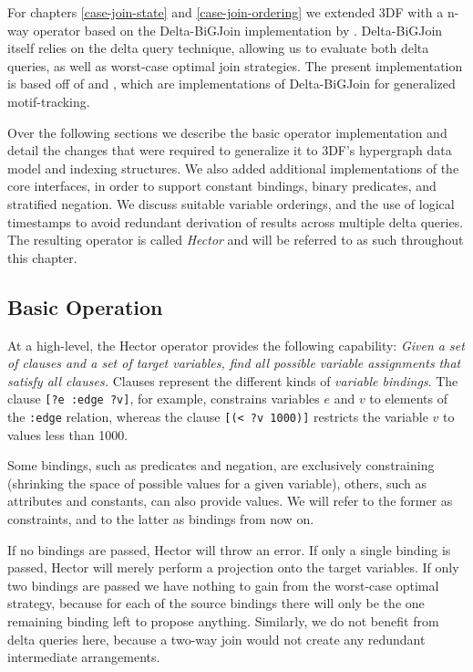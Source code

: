 \documentclass[../index.tex]{subfiles}
\begin{document}
For chapters \ref{case-join-state} and \ref{case-join-ordering} we
extended 3DF with a n-way operator based on the Delta-BiGJoin
implementation by \cite{ammar2018distributed}. Delta-BiGJoin itself
relies on the delta query technique, allowing us to evaluate both
delta queries, as well as worst-case optimal join strategies. The
present implementation is based off of \cite{dogsdogsdogs} and
\cite{dataflowjoin}, which are implementations of Delta-BiGJoin for
generalized motif-tracking.

Over the following sections we describe the basic operator
implementation and detail the changes that were required to generalize
it to 3DF's hypergraph data model and indexing structures. We also
added additional implementations of the core interfaces, in order to
support constant bindings, binary predicates, and stratified
negation. We discuss suitable variable orderings, and the use of
logical timestamps to avoid redundant derivation of results across
multiple delta queries. The resulting operator is called \emph{Hector}
and will be referred to as such throughout this chapter.

\subsection{Basic Operation}

At a high-level, the Hector operator provides the following
capability: \emph{Given a set of clauses and a set of target
  variables, find all possible variable assignments that satisfy all
  clauses.} Clauses represent the different kinds of \emph{variable
  bindings}. The clause \texttt{[?e :edge ?v]}, for example,
constrains variables $e$ and $v$ to elements of the \texttt{:edge}
relation, whereas the clause \texttt{[(< ?v 1000)]} restricts the
variable $v$ to values less than 1000.

Some bindings, such as predicates and negation, are exclusively
constraining (shrinking the space of possible values for a given
variable), others, such as attributes and constants, can also provide
values. We will refer to the former as constraints, and to the latter
as bindings from now on.

If no bindings are passed, Hector will throw an error. If only a
single binding is passed, Hector will merely perform a projection onto
the target variables. If only two bindings are passed we have nothing
to gain from the worst-case optimal strategy, because for each of the
source bindings there will only be the one remaining binding left to
propose anything. Similarly, we do not benefit from delta queries
here, because a two-way join would not create any redundant
intermediate arrangements.
\end{document}
